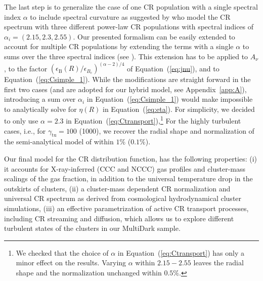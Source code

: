 \documentclass[traditabstract]{aa}
\newcommand{\rmn}{\mathrm}
\begin{document}
The last step is to generalize the case of one CR population with a single
spectral index $\alpha$ to include spectral curvature as suggested by
\cite{2010MNRAS.409..449P} who model the CR spectrum with three different
power-law CR populations with spectral indices of
$\alpha_{i}=(2.15,2.3,2.55)$. Our presented formalism can be easily extended to
account for multiple CR populations by extending the terms with a single
$\alpha$ to sums over the three spectral indices (see
\citealp{2010MNRAS.409..449P}). This extension has to be applied to $A_{\nu}$,
to the factor $(\epsilon_{\rmn{B}}(R)/ \epsilon_{B_{\rmn{c}}})^{(\alpha-2)/4}$
of Equation~(\ref{eq:jnu}), and to Equation~(\ref{eq:Csimple_1}). While the
modifications are straight forward in the first two cases (and are adopted for
our hybrid model, see Appendix~\ref{app:A}), introducing a sum over $\alpha_{i}$
in Equation~(\ref{eq:Csimple_1}) would make impossible to analytically solve for
$\eta(R)$ in Equation~(\ref{eq:eta}). For simplicity, we decided to only use
$\alpha = 2.3$ in Equation~(\ref{eq:Ctransport}),\footnote[9]{We checked that
  the choice of $\alpha$ in Equation~(\ref{eq:Ctransport}) has only a minor
  effect on the results. Varying $\alpha$ within $2.15-2.55$ leaves the radial
  shape and the normalization unchanged within $0.5\%$.} For the highly
turbulent cases, i.e., for $\gamma_{\rmn{tu}}=100$ (1000), we recover the radial
shape and normalization of the semi-analytical model of
\cite{2010MNRAS.409..449P} within $1\%$ ($0.1\%$).

Our final model for the CR distribution function, has the following properties:
(i) it accounts for X-ray-inferred (CCC and NCCC) gas profiles and cluster-mass
scalings of the gas fraction, in addition to the universal temperature drop in
the outskirts of clusters, (ii) a cluster-mass dependent CR normalization and
universal CR spectrum as derived from cosmological hydrodynamical cluster
simulations, (iii) an effective parametrization of active CR transport
processes, including CR streaming and diffusion, which allows us to explore
different turbulent states of the clusters in our MultiDark sample.
\end{document}
